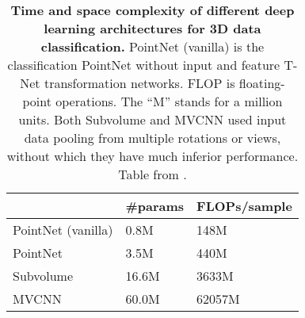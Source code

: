 \begin{table}
    \centering
    \begin{tabular}{l|l|l}
        & \#params & FLOPs/sample \\ \hline
        PointNet (vanilla) & 0.8M & 148M \\
        PointNet & 3.5M & 440M \\ \hline
        Subvolume \cite{qi2016volumetric} & 16.6M & 3633M \\ \hline
        MVCNN \cite{su2015multi} & 60.0M & 62057M \\
    \end{tabular}
    \caption{
        \textbf{Time and space complexity of different deep learning
        architectures for 3D data classification.}
        PointNet (vanilla) is the classification PointNet without input and
        feature T-Net transformation networks. FLOP is floating-point
        operations. The ``M'' stands for a million units.
        Both Subvolume and MVCNN used input data pooling from multiple
        rotations or views, without which they have much inferior performance.
        Table from \cite{qi2017pointnet}.
    } \label{table:complexity}
\end{table}
